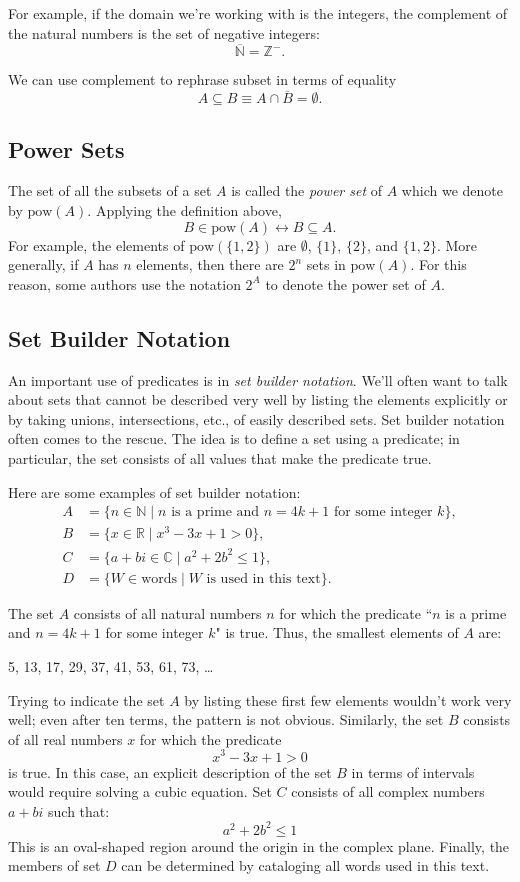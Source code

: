 \documentclass[11pt,oneside]{book}
\theoremstyle{definition}
\begin{document}
For example, if the domain we're working with is the integers, the complement of the natural numbers is the set of negative integers:
\[ \overline{\mathbb{N}} = \mathbb{Z}^{-}. \]

We can use complement to rephrase subset in terms of equality
\[ A \subseteq B \equiv A \cap \overline{B} = \emptyset. \]


\subsection{Power Sets}
The set of all the subsets of a set $A$ is called the \emph{power set} of $A$ which we denote by $\text{pow}(A)$.
Applying the definition above,
\[ B \in \text{pow}(A) \leftrightarrow B \subseteq A. \]
For example, the elements of $\text{pow}(\{ 1, 2 \})$ are $\emptyset$, $\{ 1 \}$, $\{ 2 \}$, and $\{ 1, 2 \}$.
More generally, if $A$ has $n$ elements, then there are $2^{n}$ sets in $\text{pow}(A)$.
For this reason, some authors use the notation $2^{A}$ to denote the power set of $A$.


\subsection{Set Builder Notation}
An important use of predicates is in \emph{set builder notation}.
We'll often want to talk about sets that cannot be described very well by listing the elements explicitly or by taking unions, intersections, etc., of easily described sets.
Set builder notation often comes to the rescue.
The idea is to define a set using a predicate; in particular, the set consists of all values that make the predicate true.

Here are some examples of set builder notation:
\begin{align*}
    A &= \{ n \in \mathbb{N} \mid n \text{ is a prime and } n = 4k + 1 \text{ for some integer } k \}, \\
    B &= \{ x \in \mathbb{R} \mid x^{3} - 3x + 1 > 0 \}, \\
    C &= \{ a + bi \in \mathbb{C} \mid a^{2} + 2b^{2} \leq 1 \}, \\
    D &= \{ W \in \text{words} \mid W \text{ is used in this text} \}.
\end{align*}

The set $A$ consists of all natural numbers $n$ for which the predicate ``$n$ is a prime and $n = 4k + 1$ for some integer $k$" is true.
Thus, the smallest elements of $A$ are:
\begin{center}
    5, 13, 17, 29, 37, 41, 53, 61, 73, \dots
\end{center}
Trying to indicate the set $A$ by listing these first few elements wouldn't work very well; even after ten terms, the pattern is not obvious.
Similarly, the set $B$ consists of all real numbers $x$ for which the predicate
\[ x^{3} - 3x + 1 > 0 \]
is true.
In this case, an explicit description of the set $B$ in terms of intervals would require solving a cubic equation.
Set $C$ consists of all complex numbers $a + bi$ such that:
\[ a^{2} + 2b^{2} \leq 1 \]
This is an oval-shaped region around the origin in the complex plane.
Finally, the members of set $D$ can be determined by cataloging all words used in this text.
\end{document}
